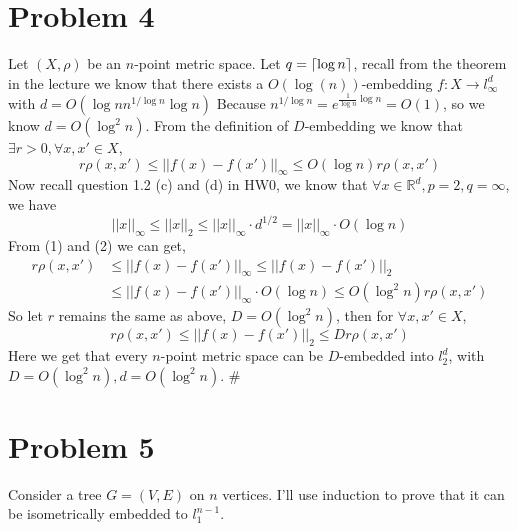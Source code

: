 \documentclass[twoside,11pt]{homework}
\begin{document}
\section*{Problem 4}
Let $(X, \rho)$ be an $n$-point metric space. Let $q = \lceil\log n\rceil$, recall from the theorem in the lecture we know that there exists a $O(\log (n))$-embedding $f:X \rightarrow l_\infty^d$ with $d = O(\log n n^{1/\log n} \log n)$ Because $n^{1/\log n} = e^{\frac{1}{\log n}\log n}=O(1)$, so we know $d=O(\log^2 n)$.
From the definition of $D$-embedding we know that $\exists r>0,\forall x,x' \in X$,
\begin{equation}
    r\rho(x,x') \leq ||f(x)-f(x')||_\infty \leq O(\log n)r \rho(x,x')
\end{equation}
Now recall question 1.2 (c) and (d) in HW0, we know that $\forall x \in \mathbb{R}^d,p=2,q=\infty$, we have
\begin{equation}
    ||x||_\infty \leq ||x||_2 \leq ||x||_\infty \cdot d^{1/2} = ||x||_\infty \cdot O(\log n)
\end{equation}
From (1) and (2) we can get, 
\begin{align*}
    r\rho(x,x') &\leq ||f(x)-f(x')||_\infty \leq ||f(x)-f(x')||_2\\&\leq||f(x)-f(x')||_\infty \cdot O(\log n) \leq O(\log ^2 n)r\rho(x,x')
\end{align*}
So let $r$ remains the same as above, $D=O(\log^2 n)$, then for $\forall x,x' \in X$,
$$r\rho(x,x') \leq ||f(x)-f(x')||_2 \leq Dr \rho(x,x')$$
Here we get that every $n$-point metric space can be $D$-embedded into $l_2^d$, with $D=O(\log ^2 n), d = O(\log^2 n)$. \#



\section*{Problem 5}
Consider a tree $G=(V,E)$ on $n$ vertices. I'll use induction to prove that it can be isometrically embedded to $l_1^{n-1}$.
\end{document}
